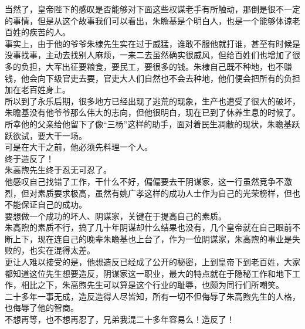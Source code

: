 \begin{multicols}{\theparacolNo}
当然了，皇帝陛下的感叹是否能够对下面这些权谋老手有所触动，那倒是很不一定的事情，但是从这个故事我们可以看出，朱瞻基是个明白人，也是一个能够体谅老百姓的疾苦的人。\\

事实上，由于他的爷爷朱棣先生实在过于威猛，谁敢不服他就打谁，甚至有时候是没事找事，主动去找别人麻烦，一来二去虽然确实很威风，但给百姓们也增加了很多的负担，大军出征要粮食，要民工，要很多的钱。朱棣自己既不种地，也不赚钱，他会向下级官吏去要，官吏大人们自然也不会去种地，他们便会把所有的负担加在老百姓身上。\\

所以到了永乐后期，很多地方已经出现了逃荒的现象，生产也遭受了很大的破坏，朱瞻基没有他爷爷那么伟大的志向，但他很明白，现在已到了休养生息的时候了。\\

所幸他的父亲给他留下了像“三杨”这样的助手，面对着民生凋敝的现状，朱瞻基跃跃欲试，要大干一场。\\

可是在大干之前，他必须先料理一个人。\\

终于造反了！\\

朱高煦先生终于忍无可忍了。\\

他感叹自己找错了工作，干什么不好，偏偏要去干阴谋家，这一行虽然竞争不激烈，但对素质要求极高，虽然有姚广孝这样的成功人士作为自己的光荣榜样，但也不能保证自己的成功。\\

要想做一个成功的坏人、阴谋家，关键在于提高自己的素质。\\

朱高煦的素质不行，搞了几十年阴谋却什么结果也没有，几个皇帝就在自己眼前不断上下，现在连自己的晚辈朱瞻基也上台了，作为一位阴谋家，朱高煦的事业是失败的，也实在混得太差。\\

更让人难以接受的是，他想造反已经成了公开的秘密，上到皇帝下到老百姓，大家都知道这位先生想要造反，阴谋家这一职业，最大的特点就在于隐秘工作和地下工作，相比之下，朱高煦先生可以算是这个行业的耻辱，也颇为同行们所嘲笑。\\

二十多年一事无成，造反造得人尽皆知，所有一切不但侮辱了朱高煦先生的人格，也侮辱了他的智商。\\

不想再等，也不想再忍了，兄弟我混二十多年容易么！造反了！\\


\end{multicols}
